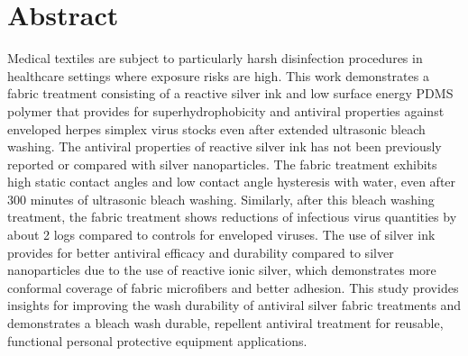 \documentclass[10pt,letterpaper]{article}
\begin{document}
\begin{flushleft}
 \setlength {\marginparwidth }{2cm}


\end{flushleft}

\section*{Abstract}
Medical textiles are subject to particularly harsh disinfection procedures 
in healthcare settings where exposure risks are high.  
This work demonstrates a fabric treatment consisting of 
a reactive silver ink and low surface energy PDMS polymer that 
provides for 
superhydrophobicity and antiviral properties against enveloped herpes simplex virus stocks 
even after extended ultrasonic bleach washing. The antiviral properties of reactive silver ink has not been previously reported or compared with silver nanoparticles.
The fabric treatment 
exhibits high static contact angles and low contact angle hysteresis with water, even after 300 minutes of ultrasonic bleach washing. Similarly, after this bleach washing treatment, the fabric treatment shows reductions of infectious virus quantities by about 2 logs compared to controls for enveloped viruses. The use of silver ink provides for 
better antiviral efficacy and durability compared to silver nanoparticles due to the use of reactive ionic silver, which demonstrates more conformal coverage of fabric microfibers and better %
adhesion.  This study provides insights for improving the wash durability of antiviral silver fabric treatments and demonstrates a bleach wash durable, repellent antiviral treatment for reusable, functional personal protective equipment applications. 
\end{document}
